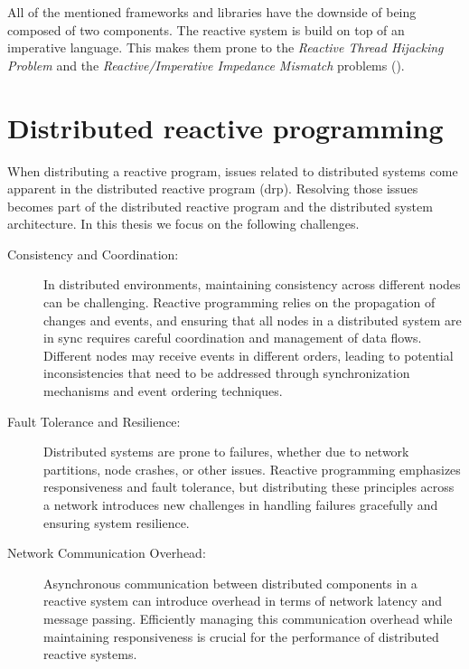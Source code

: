 \documentclass[a4paper]{book}
\begin{document}
All of the mentioned frameworks and libraries have the downside of being composed of two components. The reactive system is build on top of an imperative language. This makes them prone to the \textit{Reactive Thread Hijacking Problem} and the \textit{Reactive/Imperative Impedance Mismatch} problems (\cite{vonder_tackling_2020}).

\section{Distributed reactive programming} \label{sec:drp}



When distributing a reactive program, issues related to distributed systems come apparent in the distributed reactive program (drp). Resolving those issues becomes part of the distributed reactive program and the distributed system architecture. In this thesis we focus on the following challenges.
\begin{description}
	\item[Consistency and Coordination:] In distributed environments, maintaining consistency across different nodes can be challenging. Reactive programming relies on the propagation of changes and events, and ensuring that all nodes in a distributed system are in sync requires careful coordination and management of data flows. Different nodes may receive events in different orders, leading to potential inconsistencies that need to be addressed through synchronization mechanisms and event ordering techniques. 
	\item[Fault Tolerance and Resilience:] Distributed systems are prone to failures, whether due to network partitions, node crashes, or other issues. Reactive programming emphasizes responsiveness and fault tolerance, but distributing these principles across a network introduces new challenges in handling failures gracefully and ensuring system resilience.
	\item[Network Communication Overhead:] Asynchronous communication between distributed components in a reactive system can introduce overhead in terms of network latency and message passing. Efficiently managing this communication overhead while maintaining responsiveness is crucial for the performance of distributed reactive systems.
	
\end{description}
\end{document}
